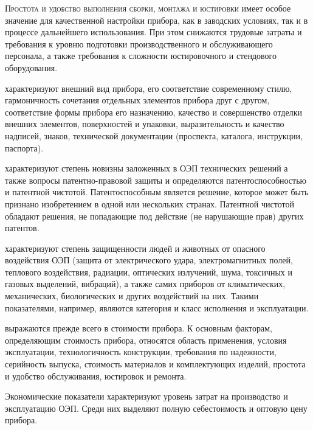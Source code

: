 \textsc{Простота и удобство выполнения сборки, монтажа и юстировки} имеет особое значение для качественной настройки прибора, как в заводских условиях, так и в процессе дальнейшего использования. При этом снижаются трудовые затраты и требования к уровню подготовки производственного и обслуживающего персонала, а также требования к сложности юстировочного и стендового оборудования.

 характеризуют внешний вид прибора, его соответствие современному стилю, гармоничность сочетания отдельных элементов прибора друг с другом, соответствие формы прибора его назначению, качество и совершенство отделки внешних элементов, поверхностей и упаковки, выразительность и качество надписей, знаков, технической документации (проспекта, каталога, инструкции, паспорта).

 характеризуют степень новизны заложенных в ОЭП технических решений а также вопросы патентно-правовой  защиты и определяются патентоспособностью и патентной чистотой. Патентоспособным является решение, которое может быть признано изобретением в одной или нескольких странах. Патентной чистотой обладают решения, не попадающие под действие (не нарушающие прав) других патентов.

 характеризуют степень защищенности людей и животных от опасного воздействия ОЭП (защита от электрического удара, электромагнитных полей, теплового воздействия, радиации, оптических излучений, шума, токсичных и газовых выделений, вибраций), а также самих приборов от климатических, механических, биологических и других воздействий на них. Такими показателями, например, являются категория и класс исполнения и эксплуатации.

 выражаются прежде всего в стоимости прибора. К основным факторам, определяющим стоимость прибора, относятся область применения, условия эксплуатации, технологичность конструкции, требования по надежности, серийность выпуска, стоимость материалов и комплектующих изделий, простота и удобство обслуживания, юстировок и ремонта. 

Экономические показатели характеризуют уровень затрат на производство и эксплуатацию ОЭП. Среди них выделяют полную себестоимость и оптовую цену прибора. 

